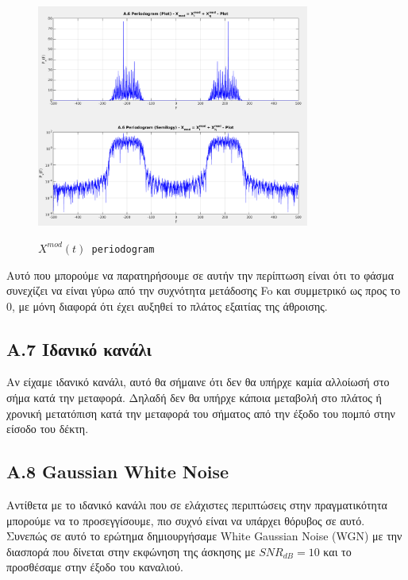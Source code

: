 \documentclass[11pt]{article}
\begin{document}
    \begin{figure}[H]
        \centering
        \includegraphics[scale=0.5, width=0.8\textwidth]{img/A6_mod_period.png} \\
        \caption{\texttt{$X^{mod}(t)$ periodogram}}
    \end{figure}
    
    \newpage \par \noindent
    Αυτό που μπορούμε να παρατηρήσουμε σε αυτήν την περίπτωση είναι ότι το φάσμα συνεχίζει να είναι γύρω από την συχνότητα μετάδοσης Fo και συμμετρικό ως προς το 0, με μόνη διαφορά ότι έχει αυξηθεί το πλάτος εξαιτίας της άθροισης.
    
    \subsection*{A.7 Ιδανικό κανάλι}
    Αν είχαμε ιδανικό κανάλι, αυτό θα σήμαινε ότι δεν θα υπήρχε καμία αλλοίωσή στο σήμα κατά την μεταφορά. 
    Δηλαδή δεν θα υπήρχε κάποια μεταβολή στο πλάτος ή χρονική μετατόπιση κατά την μεταφορά του σήματος από την έξοδο του πομπό στην είσοδο του δέκτη.

    \subsection*{A.8 Gaussian White Noise}
    Αντίθετα με το ιδανικό κανάλι που σε ελάχιστες περιπτώσεις στην πραγματικότητα μπορούμε να το προσεγγίσουμε, πιο συχνό είναι να υπάρχει θόρυβος σε αυτό.
    Συνεπώς σε αυτό το ερώτημα δημιουργήσαμε White Gaussian Noise (WGN) με την διασπορά που δίνεται στην εκφώνηση της άσκησης με $SNR_{dB}=10$ και το προσθέσαμε στην έξοδο του καναλιού.
    
\end{document}
